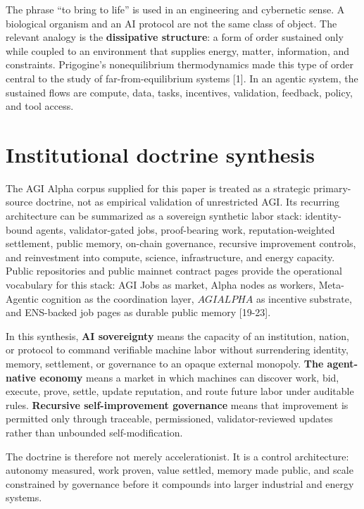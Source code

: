 \documentclass[
  11pt,
]{article}
\begin{document}
The phrase ``to bring to life'' is used in an engineering and cybernetic
sense. A biological organism and an AI protocol are not the same class
of object. The relevant analogy is the \textbf{dissipative structure}: a
form of order sustained only while coupled to an environment that
supplies energy, matter, information, and constraints. Prigogine's
nonequilibrium thermodynamics made this type of order central to the
study of far-from-equilibrium systems {[}1{]}. In an agentic system, the
sustained flows are compute, data, tasks, incentives, validation,
feedback, policy, and tool access.

\section{Institutional doctrine
synthesis}\label{institutional-doctrine-synthesis}

The AGI Alpha corpus supplied for this paper is treated as a strategic
primary-source doctrine, not as empirical validation of unrestricted
AGI. Its recurring architecture can be summarized as a sovereign
synthetic labor stack: identity-bound agents, validator-gated jobs,
proof-bearing work, reputation-weighted settlement, public memory,
on-chain governance, recursive improvement controls, and reinvestment
into compute, science, infrastructure, and energy capacity. Public
repositories and public mainnet contract pages provide the operational
vocabulary for this stack: AGI Jobs as market, Alpha nodes as workers,
Meta-Agentic cognition as the coordination layer, \(AGIALPHA\) as
incentive substrate, and ENS-backed job pages as durable public memory
{[}19-23{]}.

In this synthesis, \textbf{AI sovereignty} means the capacity of an
institution, nation, or protocol to command verifiable machine labor
without surrendering identity, memory, settlement, or governance to an
opaque external monopoly. \textbf{The agent-native economy} means a
market in which machines can discover work, bid, execute, prove, settle,
update reputation, and route future labor under auditable rules.
\textbf{Recursive self-improvement governance} means that improvement is
permitted only through traceable, permissioned, validator-reviewed
updates rather than unbounded self-modification.

The doctrine is therefore not merely accelerationist. It is a control
architecture: autonomy measured, work proven, value settled, memory made
public, and scale constrained by governance before it compounds into
larger industrial and energy systems.
\end{document}
